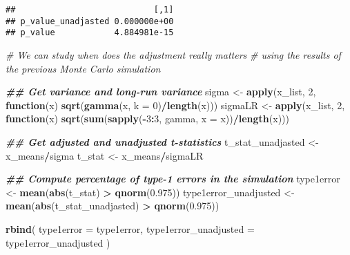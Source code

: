 \documentclass[
]{book}
\newenvironment{Shaded}{\begin{snugshade}}{\end{snugshade}}
\newcommand{\AttributeTok}[1]{\textcolor[rgb]{0.13,0.29,0.53}{#1}}
\newcommand{\CommentTok}[1]{\textcolor[rgb]{0.56,0.35,0.01}{\textit{#1}}}
\newcommand{\ControlFlowTok}[1]{\textcolor[rgb]{0.13,0.29,0.53}{\textbf{#1}}}
\newcommand{\DecValTok}[1]{\textcolor[rgb]{0.00,0.00,0.81}{#1}}
\newcommand{\DocumentationTok}[1]{\textcolor[rgb]{0.56,0.35,0.01}{\textbf{\textit{#1}}}}
\newcommand{\FloatTok}[1]{\textcolor[rgb]{0.00,0.00,0.81}{#1}}
\newcommand{\FunctionTok}[1]{\textcolor[rgb]{0.13,0.29,0.53}{\textbf{#1}}}
\newcommand{\NormalTok}[1]{#1}
\newcommand{\OtherTok}[1]{\textcolor[rgb]{0.56,0.35,0.01}{#1}}
\newcommand{\SpecialCharTok}[1]{\textcolor[rgb]{0.81,0.36,0.00}{\textbf{#1}}}
\begin{document}
\begin{verbatim}
##                            [,1]
## p_value_unadjasted 0.000000e+00
## p_value            4.884981e-15
\end{verbatim}

\begin{Shaded}
\begin{Highlighting}[]
\CommentTok{\# We can study when does the adjustment really matters }
\CommentTok{\# using the results of the previous Monte Carlo simulation}

\DocumentationTok{\#\# Get variance and long{-}run variance}
\NormalTok{sigma }\OtherTok{\textless{}{-}} \FunctionTok{apply}\NormalTok{(x\_list, }\DecValTok{2}\NormalTok{, }\ControlFlowTok{function}\NormalTok{(x) }\FunctionTok{sqrt}\NormalTok{(}\FunctionTok{gamma}\NormalTok{(x, }\AttributeTok{k =} \DecValTok{0}\NormalTok{)}\SpecialCharTok{/}\FunctionTok{length}\NormalTok{(x)))}
\NormalTok{sigmaLR }\OtherTok{\textless{}{-}} \FunctionTok{apply}\NormalTok{(x\_list, }\DecValTok{2}\NormalTok{, }\ControlFlowTok{function}\NormalTok{(x) }\FunctionTok{sqrt}\NormalTok{(}\FunctionTok{sum}\NormalTok{(}\FunctionTok{sapply}\NormalTok{(}\SpecialCharTok{{-}}\DecValTok{3}\SpecialCharTok{:}\DecValTok{3}\NormalTok{, gamma, }\AttributeTok{x =}\NormalTok{ x))}\SpecialCharTok{/}\FunctionTok{length}\NormalTok{(x)))}

\DocumentationTok{\#\# Get adjusted and unadjusted t{-}statistics}
\NormalTok{t\_stat\_unadjasted }\OtherTok{\textless{}{-}}\NormalTok{ x\_means}\SpecialCharTok{/}\NormalTok{sigma}
\NormalTok{t\_stat }\OtherTok{\textless{}{-}}\NormalTok{ x\_means}\SpecialCharTok{/}\NormalTok{sigmaLR}

\DocumentationTok{\#\# Compute percentage of type{-}1 errors in the simulation}
\NormalTok{type1error }\OtherTok{\textless{}{-}} \FunctionTok{mean}\NormalTok{(}\FunctionTok{abs}\NormalTok{(t\_stat) }\SpecialCharTok{\textgreater{}} \FunctionTok{qnorm}\NormalTok{(}\FloatTok{0.975}\NormalTok{))}
\NormalTok{type1error\_unadjusted }\OtherTok{\textless{}{-}} \FunctionTok{mean}\NormalTok{(}\FunctionTok{abs}\NormalTok{(t\_stat\_unadjasted) }\SpecialCharTok{\textgreater{}} \FunctionTok{qnorm}\NormalTok{(}\FloatTok{0.975}\NormalTok{))}

\FunctionTok{rbind}\NormalTok{(}
  \AttributeTok{type1error =}\NormalTok{ type1error,}
  \AttributeTok{type1error\_unadjusted =}\NormalTok{ type1error\_unadjusted}
\NormalTok{)}
\end{Highlighting}
\end{Shaded}
\end{document}
